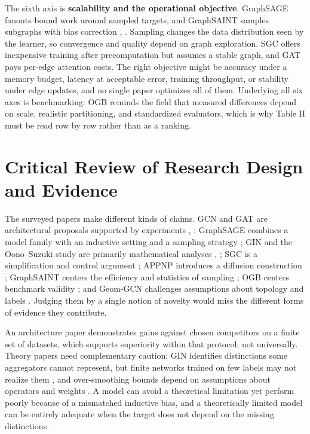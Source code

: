 \documentclass[conference]{IEEEtran}
\begin{document}
The sixth axis is \textbf{scalability and the operational objective}. GraphSAGE fanouts bound work around sampled targets, and GraphSAINT samples subgraphs with bias correction \cite{b2}, \cite{b8}. Sampling changes the data distribution seen by the learner, so convergence and quality depend on graph exploration. SGC offers inexpensive training after precomputation but assumes a stable graph, and GAT pays per-edge attention costs. The right objective might be accuracy under a memory budget, latency at acceptable error, training throughput, or stability under edge updates, and no single paper optimizes all of them. Underlying all six axes is benchmarking: OGB \cite{b9} reminds the field that measured differences depend on scale, realistic partitioning, and standardized evaluators, which is why Table II must be read row by row rather than as a ranking.

\section{Critical Review of Research Design and Evidence}

The surveyed papers make different kinds of claims. GCN and GAT are architectural proposals supported by experiments \cite{b1}, \cite{b3}; GraphSAGE combines a model family with an inductive setting and a sampling strategy \cite{b2}; GIN and the Oono--Suzuki study are primarily mathematical analyses \cite{b4}, \cite{b7}; SGC is a simplification and control argument \cite{b5}; APPNP introduces a diffusion construction \cite{b6}; GraphSAINT centers the efficiency and statistics of sampling \cite{b8}; OGB centers benchmark validity \cite{b9}; and Geom-GCN challenges assumptions about topology and labels \cite{b10}. Judging them by a single notion of novelty would miss the different forms of evidence they contribute.

An architecture paper demonstrates gains against chosen competitors on a finite set of datasets, which supports superiority within that protocol, not universally. Theory papers need complementary caution: GIN identifies distinctions some aggregators cannot represent, but finite networks trained on few labels may not realize them \cite{b4}, and over-smoothing bounds depend on assumptions about operators and weights \cite{b7}. A model can avoid a theoretical limitation yet perform poorly because of a mismatched inductive bias, and a theoretically limited model can be entirely adequate when the target does not depend on the missing distinctions.
\end{document}
